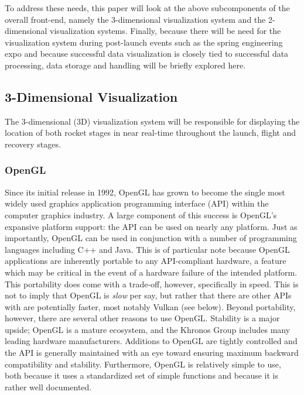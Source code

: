 \documentclass[onecolumn, draftclsnofoot,10pt, compsoc]{IEEEtran}
\begin{document}
	\par To address these needs, this paper will look at the above subcomponents of the overall front-end, namely the 3-dimensional visualization system and the 2-dimensional visualization systems.
	Finally, because there will be need for the visualization system during post-launch events such as the spring engineering expo and because successful data visualization is closely tied to successful data processing, data storage and handling will be briefly explored here.
	
\subsection{3-Dimensional Visualization}
	The 3-dimensional (3D) visualization system will be responsible for displaying the location of both rocket stages in near real-time throughout the launch, flight and recovery stages.

	\subsubsection{OpenGL}
		Since its initial release in 1992, OpenGL has grown to become the single most widely used graphics application programming interface (API) within the computer graphics industry.
		A large component of this success is OpenGL's expansive platform support: the API can be used on nearly any platform.
		Just as importantly, OpenGL can be used in conjunction with a number of programming languages including C++ and Java. \cite{opengl}
		This is of particular note because OpenGL applications are inherently portable to any API-compliant hardware, a feature which may be critical in the event of a hardware failure of the intended platform. \cite{opengl}
		This portability does come with a trade-off, however, specifically in speed. 
		This is not to imply that OpenGL is \textit{slow} per say, but rather that there are other APIs with are potentially faster, most notably Vulkan (see below).
		Beyond portability, however, there are several other reasons to use OpenGL.
		Stability is a major upside; OpenGL is a mature ecosystem, and the Khronos Group includes many leading hardware manufacturers.
		Additions to OpenGL are tightly controlled and the API is generally maintained with an eye toward ensuring maximum backward compatibility and stability. \cite{opengl}
		Furthermore, OpenGL is relatively simple to use, both because it uses a standardized set of simple functions and because it is rather well documented. \cite{opengl}
		
\end{document}
